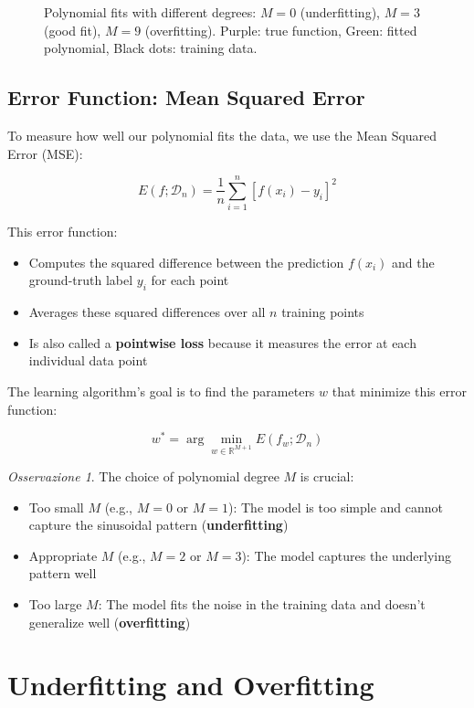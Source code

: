 \documentclass[11pt,a4paper]{article}
\theoremstyle{definition}
\theoremstyle{plain}
\theoremstyle{remark}
\newtheorem*{observation}{Osservazione}
\begin{document}
\begin{figure}[h]
\begin{tikzpicture}
\end{tikzpicture}
\caption{Polynomial fits with different degrees: $M=0$ (underfitting), $M=3$ (good fit), $M=9$ (overfitting). Purple: true function, Green: fitted polynomial, Black dots: training data.}
\end{figure}

\subsection{Error Function: Mean Squared Error}

To measure how well our polynomial fits the data, we use the Mean Squared Error (MSE):

\[
E(f; \mathcal{D}_n) = \frac{1}{n} \sum_{i=1}^{n} [f(x_i) - y_i]^2
\]

This error function:
\begin{itemize}
    \item Computes the squared difference between the prediction $f(x_i)$ and the ground-truth label $y_i$ for each point
    \item Averages these squared differences over all $n$ training points
    \item Is also called a \textbf{pointwise loss} because it measures the error at each individual data point
\end{itemize}

The learning algorithm's goal is to find the parameters $w$ that minimize this error function:

\[
w^* = \arg\min_{w \in \mathbb{R}^{M+1}} E(f_w; \mathcal{D}_n)
\]

\begin{observation}
The choice of polynomial degree $M$ is crucial:
\begin{itemize}
    \item Too small $M$ (e.g., $M=0$ or $M=1$): The model is too simple and cannot capture the sinusoidal pattern (\textbf{underfitting})
    \item Appropriate $M$ (e.g., $M=2$ or $M=3$): The model captures the underlying pattern well
    \item Too large $M$: The model fits the noise in the training data and doesn't generalize well (\textbf{overfitting})
\end{itemize}
\end{observation}

\section{Underfitting and Overfitting}
\end{document}
